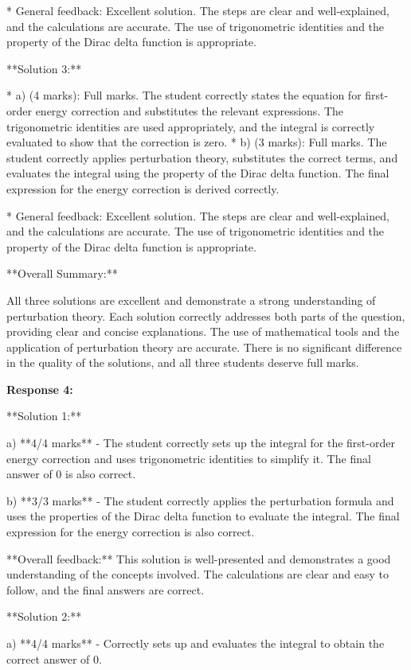 \documentclass[a4paper,11pt]{article}
\begin{document}
* General feedback: Excellent solution. The steps are clear and well-explained, and the calculations are accurate. The use of trigonometric identities and the property of the Dirac delta function is appropriate.

**Solution 3:**

* a) (4 marks): Full marks. The student correctly states the equation for first-order energy correction and substitutes the relevant expressions. The trigonometric identities are used appropriately, and the integral is correctly evaluated to show that the correction is zero.
* b) (3 marks): Full marks. The student correctly applies perturbation theory, substitutes the correct terms, and evaluates the integral using the property of the Dirac delta function. The final expression for the energy correction is derived correctly.

* General feedback: Excellent solution. The steps are clear and well-explained, and the calculations are accurate. The use of trigonometric identities and the property of the Dirac delta function is appropriate.

**Overall Summary:**

All three solutions are excellent and demonstrate a strong understanding of perturbation theory. Each solution correctly addresses both parts of the question, providing clear and concise explanations. The use of mathematical tools and the application of perturbation theory are accurate. There is no significant difference in the quality of the solutions, and all three students deserve full marks.

\textbf{Response 4:}

**Solution 1:**

a) **4/4 marks** - The student correctly sets up the integral for the first-order energy correction and uses trigonometric identities to simplify it. The final answer of 0 is also correct.

b) **3/3 marks** - The student correctly applies the perturbation formula and uses the properties of the Dirac delta function to evaluate the integral. The final expression for the energy correction is also correct.

**Overall feedback:** This solution is well-presented and demonstrates a good understanding of the concepts involved. The calculations are clear and easy to follow, and the final answers are correct.

**Solution 2:**

a) **4/4 marks** - Correctly sets up and evaluates the integral to obtain the correct answer of 0.
\end{document}
